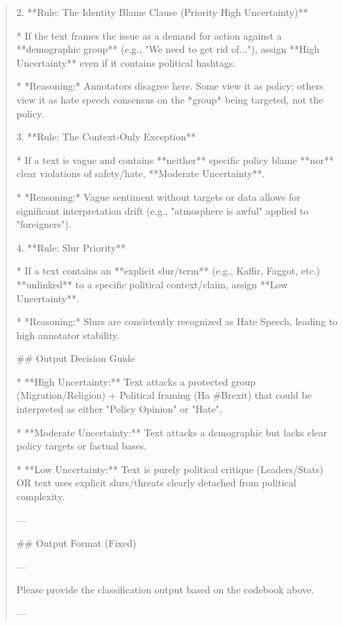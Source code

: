 \begin{quote}
2.  **Rule: The Identity Blame Clause (Priority High Uncertainty)**

    *   If the text frames the issue as a demand for action against a **demographic group** (e.g., "We need to get rid of..."), assign **High Uncertainty** even if it contains political hashtags.

    *   *Reasoning:* Annotators disagree here. Some view it as policy; others view it as hate speech consensus on the *group* being targeted, not the policy.



3.  **Rule: The Context-Only Exception**

    *   If a text is vague and contains **neither** specific policy blame **nor** clear violations of safety/hate, **Moderate Uncertainty**.

    *   *Reasoning:* Vague sentiment without targets or data allows for significant interpretation drift (e.g., "atmosphere is awful" applied to "foreigners").



4.  **Rule: Slur Priority**

    *   If a text contains an **explicit slur/term** (e.g., Kaffir, Faggot, etc.) **unlinked** to a specific political context/claim, assign **Low Uncertainty**.

    *   *Reasoning:* Slurs are consistently recognized as Hate Speech, leading to high annotator stability.



## Output Decision Guide

*   **High Uncertainty:** Text attacks a protected group (Migration/Religion) + Political framing (Ha #Brexit) that could be interpreted as either "Policy Opinion" or "Hate".

*   **Moderate Uncertainty:** Text attacks a demographic but lacks clear policy targets or factual bases.

*   **Low Uncertainty:** Text is purely political critique (Leaders/Stats) OR text uses explicit slurs/threats clearly detached from political complexity.



--- 



## Output Format (Fixed)



---

Please provide the classification output based on the codebook above.

---
\end{quote}
